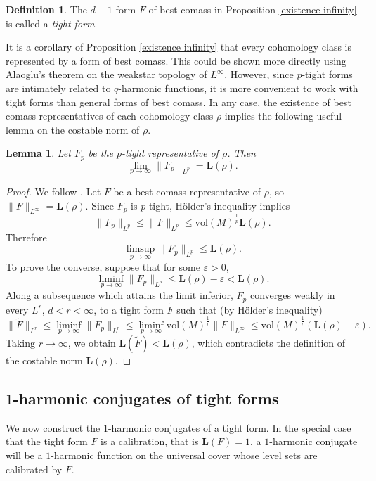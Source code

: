 \documentclass[reqno,11pt]{amsart}
\newcommand{\vol}{\mathrm{vol}}
\newcommand{\Comass}{\mathbf L}
\newcommand{\dfn}[1]{\emph{#1}\index{#1}}
\newtheorem{lemma}[theorem]{Lemma}
\theoremstyle{definition}
\newtheorem{definition}[theorem]{Definition}
\numberwithin{equation}{section}
\begin{document}
\begin{definition}
The $d - 1$-form $F$ of best comass in Proposition \ref{existence infinity} is called a \dfn{tight form}.
\end{definition}

It is a corollary of Proposition \ref{existence infinity} that every cohomology class is represented by a form of best comass.
This could be shown more directly using Alaoglu's theorem on the weakstar topology of $L^\infty$.
However, since $p$-tight forms are intimately related to $q$-harmonic functions, it is more convenient to work with tight forms than general forms of best comass.
In any case, the existence of best comass representatives of each cohomology class $\rho$ implies the following useful lemma on the costable norm of $\rho$.

\begin{lemma}\label{p tights approximate L}
Let $F_p$ be the $p$-tight representative of $\rho$. Then 
$$\lim_{p \to \infty} \|F_p\|_{L^p} = \Comass(\rho).$$
\end{lemma}
\begin{proof}
We follow \cite[Lemma 2.7]{daskalopoulos2020transverse}.
Let $F$ be a best comass representative of $\rho$, so $\|F\|_{L^\infty} = \Comass(\rho)$.
Since $F_p$ is $p$-tight, H\"older's inequality implies 
$$\|F_p\|_{L^p} \leq \|F\|_{L^p} \leq \vol(M)^{\frac{1}{p}} \Comass(\rho).$$
Therefore 
$$\limsup_{p \to \infty} \|F_p\|_{L^p} \leq \Comass(\rho).$$
To prove the converse, suppose that for some $\varepsilon > 0$,
$$\liminf_{p \to \infty} \|F_p\|_{L^p} \leq \Comass(\rho) - \varepsilon < \Comass(\rho).$$
Along a subsequence which attains the limit inferior, $F_p$ converges weakly in every $L^r$, $d < r < \infty$, to a tight form $\tilde F$ such that (by H\"older's inequality)
$$\|\tilde F\|_{L^r} \leq \liminf_{p \to \infty} \|F_p\|_{L^r} \leq \liminf_{p \to \infty} \vol(M)^{\frac{1}{r}} \|\tilde F\|_{L^\infty} \leq \vol(M)^{\frac{1}{r}} (\Comass(\rho) - \varepsilon).$$
Taking $r \to \infty$, we obtain $\Comass(\tilde F) < \Comass(\rho)$, which contradicts the definition of the costable norm $\Comass(\rho)$.
\end{proof}


\subsection{\texorpdfstring{$1$-harmonic conjugates of tight forms}{One-harmonic conjugates of tight forms}}
We now construct the $1$-harmonic conjugates of a tight form.
In the special case that the tight form $F$ is a calibration, that is $\Comass(F) = 1$, a $1$-harmonic conjugate will be a $1$-harmonic function on the universal cover whose level sets are calibrated by $F$.
\end{document}
